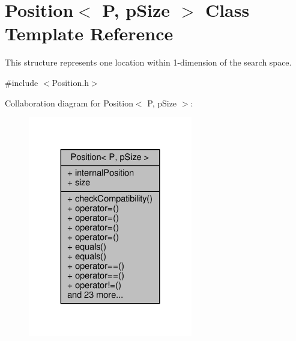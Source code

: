 \hypertarget{structPosition}{}\section{Position$<$ P, p\+Size $>$ Class Template Reference}
\label{structPosition}


This structure represents one location within 1-\/dimension of the search space.  




{\ttfamily \#include $<$Position.\+h$>$}



Collaboration diagram for Position$<$ P, p\+Size $>$\+:\nopagebreak
\begin{figure}[H]
\begin{center}
\leavevmode
\includegraphics[width=203pt]{structPosition__coll__graph}
\end{center}
\end{figure}
